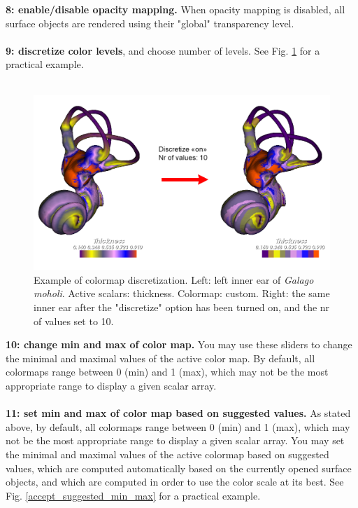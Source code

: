 \noindent
\textbf{8: enable/disable opacity mapping.} When opacity mapping is disabled, all surface objects are rendered using their "global" transparency level.\\\\

\noindent
\textbf{9: discretize color levels}, and choose number of levels. See Fig. \ref{discretize_example} for a practical example.\\\\
\begin{figure}
  \centering
  \includegraphics[scale=0.38]{images/11/discretize_on.png} 
	\caption{
Example of colormap discretization.  Left: left inner ear of \textit{Galago moholi}. Active scalars: thickness. Colormap: custom. Right: the same inner ear after the "discretize" option has been turned on, and the nr of values set to 10.}
\label{discretize_example}
 
\end{figure}

\noindent
\textbf{10: change min and max of color map.} You may use these sliders to change the minimal and maximal values of the active color map. By default, all colormaps range between 0 (min) and 1 (max), which may not be the most appropriate range to display a given scalar array. \\\\ 


\noindent
\textbf{11: set min and max of color map based on suggested values.} As stated above, by default, all colormaps range between 0 (min) and 1 (max), which may not be the most appropriate range to display a given scalar array. You may set the minimal and maximal values of the active colormap based on suggested values, which are computed automatically based on the currently opened surface objects, and which are computed in order to use the color scale at its best. See Fig. \ref{accept_suggested_min_max} for a practical example. \\\\


